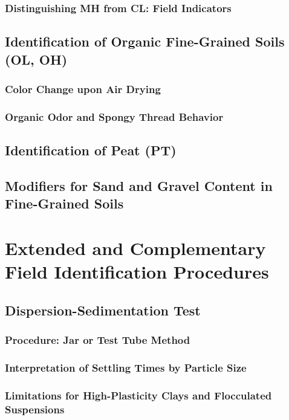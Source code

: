 \subsubsection{Distinguishing MH from CL: Field Indicators}

\subsection{Identification of Organic Fine-Grained Soils (OL, OH)}

\subsubsection{Color Change upon Air Drying}

\subsubsection{Organic Odor and Spongy Thread Behavior}

\subsection{Identification of Peat (PT)}

\subsection{Modifiers for Sand and Gravel Content in Fine-Grained Soils}

\section{Extended and Complementary Field Identification Procedures}

\subsection{Dispersion-Sedimentation Test}

\subsubsection{Procedure: Jar or Test Tube Method}

\subsubsection{Interpretation of Settling Times by Particle Size}

\subsubsection{Limitations for High-Plasticity Clays and Flocculated Suspensions}

